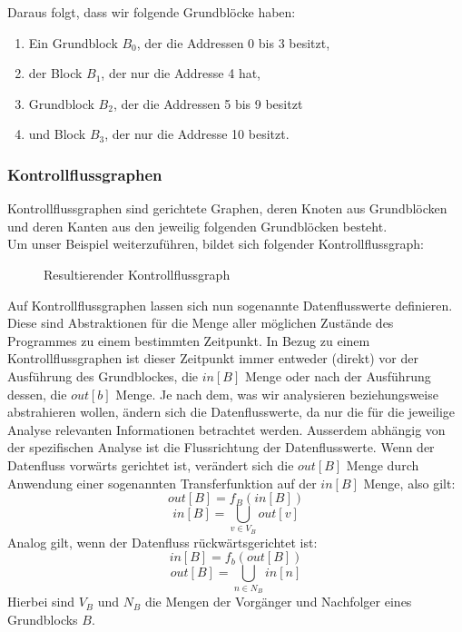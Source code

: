 Daraus folgt, dass wir folgende Grundblöcke haben:
\begin{enumerate}
  \item Ein Grundblock $B_0$, der die Addressen 0 bis 3 besitzt,
  \item der Block $B_1$, der nur die Addresse 4 hat,
  \item Grundblock $B_2$, der die Addressen 5 bis 9 besitzt
  \item und Block $B_3$, der nur die Addresse 10 besitzt.
\end{enumerate}




\newpage
\subsubsection{Kontrollflussgraphen}
Kontrollflussgraphen sind gerichtete Graphen, deren Knoten aus Grundblöcken und 
deren Kanten aus den jeweilig folgenden Grundblöcken besteht.\\

Um unser Beispiel weiterzuführen, bildet sich folgender Kontrollflussgraph:
\begin{figure}[h]
  \centering
  \caption{Resultierender Kontrollflussgraph}
  \label{fig:fib-cfg}
\end{figure}

Auf Kontrollflussgraphen lassen sich nun sogenannte Datenflusswerte definieren.
Diese sind Abstraktionen für die Menge aller möglichen Zustände des Programmes
zu einem bestimmten Zeitpunkt. In Bezug zu einem Kontrollflussgraphen ist dieser
Zeitpunkt immer entweder (direkt) vor der Ausführung des Grundblockes, die $in[B]$ Menge
oder nach der Ausführung dessen, die $out[b]$ Menge.
Je nach dem, was wir analysieren beziehungsweise abstrahieren wollen, ändern sich
die Datenflusswerte, da nur die für die jeweilige Analyse relevanten Informationen
betrachtet werden. Ausserdem abhängig von der spezifischen Analyse ist die
Flussrichtung der Datenflusswerte. Wenn der Datenfluss vorwärts gerichtet ist,
verändert sich die $out[B]$ Menge durch Anwendung einer sogenannten Transferfunktion
auf der $in[B]$ Menge, also gilt:
\[out[B]=f_B(in[B])\] 
\[in[B]=\bigcup_{v\in V_B}out[v]\]
Analog gilt, wenn der Datenfluss
rückwärtsgerichtet ist: 
\[in[B]=f_b(out[B])\]
\[out[B]=\bigcup_{n\in N_B}in[n]\]
Hierbei sind $V_B$ und $N_B$ die Mengen der Vorgänger und Nachfolger
eines Grundblocks $B$.\cite[S.732-734]{D}



